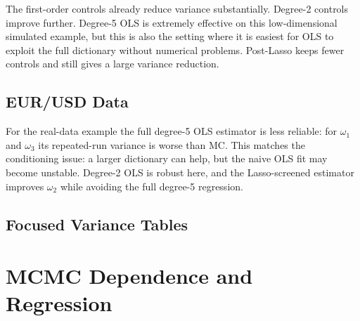 \documentclass[11pt]{article}
\begin{document}
The first-order controls already reduce variance substantially.  Degree-2 controls improve further.  Degree-5 OLS is extremely effective on this low-dimensional simulated example, but this is also the setting where it is easiest for OLS to exploit the full dictionary without numerical problems.  Post-Lasso keeps fewer controls and still gives a large variance reduction.

\subsection{EUR/USD Data}

\begin{table}[H]
  \centering
  \scriptsize
  \resizebox{\textwidth}{!}{}
  \caption{Repeated-run summary for EUR/USD returns.  The reference for the RMSE column is the pooled raw-MC mean.}
\end{table}

For the real-data example the full degree-5 OLS estimator is less reliable: for \(\omega_1\) and \(\omega_3\) its repeated-run variance is worse than MC.  This matches the conditioning issue: a larger dictionary can help, but the naive OLS fit may become unstable.  Degree-2 OLS is robust here, and the Lasso-screened estimator improves \(\omega_2\) while avoiding the full degree-5 regression.

\subsection{Focused Variance Tables}

\begin{table}[H]
  \centering
  \scriptsize
  \resizebox{\textwidth}{!}{}
  \caption{Variance comparison for the first-order control-variate step only.}
\end{table}

\begin{table}[H]
  \centering
  \scriptsize
  \resizebox{\textwidth}{!}{}
  \caption{Step 3 variance comparison: full degree-5 OLS versus Lasso-screened degree-5 controls.}
\end{table}

\section{MCMC Dependence and Regression}
\end{document}
